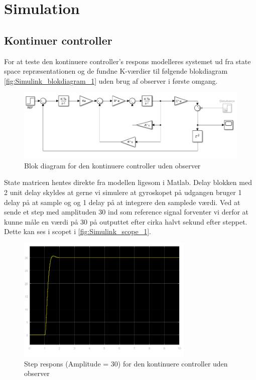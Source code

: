 \section{Simulation}
\subsection{Kontinuer controller}
For at teste den kontinuere controller's respons modelleres systemet ud fra state space repræsentationen og de fundne K-værdier til følgende blokdiagram \autoref{fig:Simulink_blokdiagram_1} uden brug af observer i første omgang. 

\begin{figure}[H]
	\centering
	\includegraphics[width = 1\textwidth]{figur/Simulink_blokdiagram_1}
	\caption{Blok diagram for den kontinuere controller uden observer}
	\label{fig:Simulink_blokdiagram_1}
\end{figure}

State matricen hentes direkte fra modellen ligesom i Matlab. Delay blokken med 2 unit delay skyldes at gerne vi simulere at gyroskopet på udgangen bruger 1 delay på at sample og og 1 delay på at integrere den samplede værdi.
Ved at sende et step med amplituden 30 ind som reference signal forventer vi derfor at kunne måle en værdi på 30 på outputtet efter cirka halvt sekund efter steppet. Dette kan ses i scopet i \autoref{fig:Simulink_scope_1}.

\begin{figure}[H]
	\centering
	\includegraphics[width = 0.75\textwidth]{figur/Simulink_scope_1}
	\caption{Step respons (Amplitude = 30) for den kontinuere controller uden observer}
	\label{fig:Simulink_scope_1}
\end{figure}

